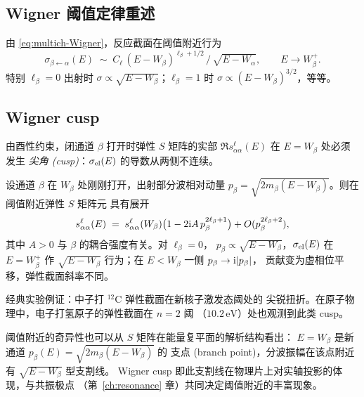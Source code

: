 \subsection{Wigner 阈值定律重述}

由 \eqref{eq:multich-Wigner}，反应截面在阈值附近行为
\begin{equation}
  \sigma_{\beta\leftarrow\alpha}(E)\;\sim\;
  C_\ell\,(E-W_\beta)^{\ell_\beta+1/2}\,/\,\sqrt{E-W_\alpha} ,\qquad E\to W_\beta^+ .
\end{equation}
特别 $\ell_\beta=0$ 出射时 $\sigma\propto\sqrt{E-W_\beta}$；$\ell_\beta=1$
时 $\sigma\propto (E-W_\beta)^{3/2}$，等等。

\subsection{Wigner cusp}

由酉性约束，闭通道 $\beta$ 打开时弹性 $S$ 矩阵的实部
$\Re s_{\alpha\alpha}^\ell(E)$ 在 $E=W_\beta$ 处必须发生
\emph{尖角 (cusp)}：$\sigma_{\rm el}(E)$ 的导数从两侧不连续。

\begin{theorem}\label{thm:multich-cusp}
  设通道 $\beta$ 在 $W_\beta$ 处刚刚打开，出射部分波相对动量
  $p_\beta=\sqrt{2 m_\beta(E-W_\beta)}$。则在阈值附近弹性 $S$ 矩阵元
  具有展开
  \begin{equation}
    s_{\alpha\alpha}^\ell(E)\;=\;
    s_{\alpha\alpha}^\ell(W_\beta)\bigl(1-2\mathrm{i} A\,p_\beta^{2\ell_\beta+1}\bigr)
     +O(p_\beta^{2\ell_\beta+2}) ,
  \end{equation}
  其中 $A>0$ 与 $\beta$ 的耦合强度有关。对 $\ell_\beta=0$，
  $p_\beta\propto\sqrt{E-W_\beta}$，$\sigma_{\rm el}(E)$ 在 $E=W_\beta^+$
  作 $\sqrt{E-W_\beta}$ 行为；在 $E<W_\beta$ 一侧 $p_\beta\to\mathrm{i}|p_\beta|$，
  贡献变为虚相位平移，弹性截面斜率不同。
\end{theorem}

经典实验例证：中子打 ${}^{12}\text{C}$ 弹性截面在新核子激发态阈处的
尖锐扭折。在原子物理中，电子打氢原子的弹性截面在 $n=2$ 阈
（$10.2\,\text{eV}$）处也观测到此类 cusp。

\begin{remark}\label{rmk:multich-virtual-cusp}
  阈值附近的奇异性也可以从 $S$ 矩阵在能量复平面的解析结构看出：
  $E=W_\beta$ 是新通道 $p_\beta(E)=\sqrt{2m_\beta(E-W_\beta)}$ 的
  支点 (branch point)，分波振幅在该点附近有 $\sqrt{E-W_\beta}$ 型支割线。
  Wigner cusp 即此支割线在物理片上对实轴投影的体现，与共振极点
  （第~\ref{ch:resonance} 章）共同决定阈值附近的丰富现象。
\end{remark}

